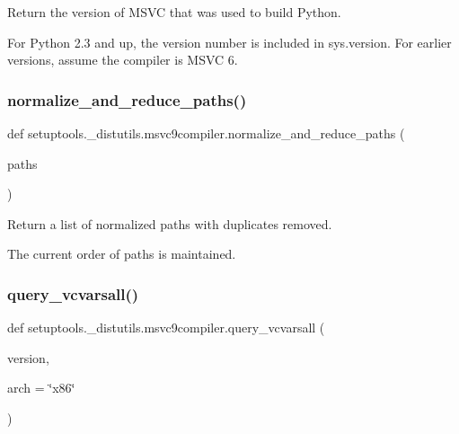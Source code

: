 \begin{DoxyVerb}Return the version of MSVC that was used to build Python.

For Python 2.3 and up, the version number is included in
sys.version.  For earlier versions, assume the compiler is MSVC 6.
\end{DoxyVerb}
 \mbox{\label{namespacesetuptools_1_1__distutils_1_1msvc9compiler_ad5c2a4a0af506b05e108b8ec9689d1b9}} 
\subsubsection{\texorpdfstring{normalize\+\_\+and\+\_\+reduce\+\_\+paths()}{normalize\_and\_reduce\_paths()}}
{\footnotesize\ttfamily def setuptools.\+\_\+distutils.\+msvc9compiler.\+normalize\+\_\+and\+\_\+reduce\+\_\+paths (\begin{DoxyParamCaption}\item[{}]{paths }\end{DoxyParamCaption})}

\begin{DoxyVerb}Return a list of normalized paths with duplicates removed.

The current order of paths is maintained.
\end{DoxyVerb}
 \mbox{\label{namespacesetuptools_1_1__distutils_1_1msvc9compiler_a97c300b2c4cda029520e92d5801036f9}} 
\subsubsection{\texorpdfstring{query\+\_\+vcvarsall()}{query\_vcvarsall()}}
{\footnotesize\ttfamily def setuptools.\+\_\+distutils.\+msvc9compiler.\+query\+\_\+vcvarsall (\begin{DoxyParamCaption}\item[{}]{version,  }\item[{}]{arch = {\ttfamily \char`\"{}x86\char`\"{}} }\end{DoxyParamCaption})}

